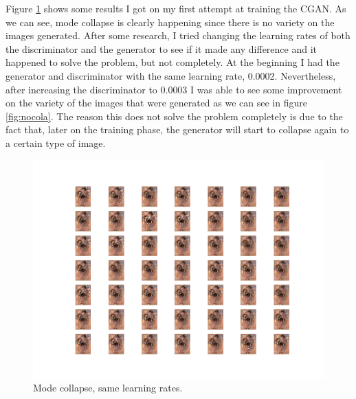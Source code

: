 \documentclass[12pt,a4paper,oneside]{memoir}
\begin{document}
\par

Figure \ref{fig:mdcolap} shows some results I got on my first attempt at training the \acs{CGAN}. As we can see, mode collapse is clearly happening since there is no variety on the images generated. After some research, I tried changing the learning rates of both the discriminator and the generator to see if it made any difference and it happened to solve the problem, but not completely. At the beginning I had the generator and discriminator with the same learning rate, 0.0002. Nevertheless, after increasing the discriminator to 0.0003 I was able to see some improvement on the variety of the images that were generated as we can see in figure \ref{fig:nocola}. The reason this does not solve the problem completely is due to the fact that, later on the training phase, the generator will start to collapse again to a certain type of image.





\begin{figure}[H]
\centering
\includegraphics[width=1\textwidth]{images/mode_collapse.png}
\caption{Mode collapse, same learning rates.}
\centering
\label{fig:mdcolap}
\end{figure}
\end{document}
